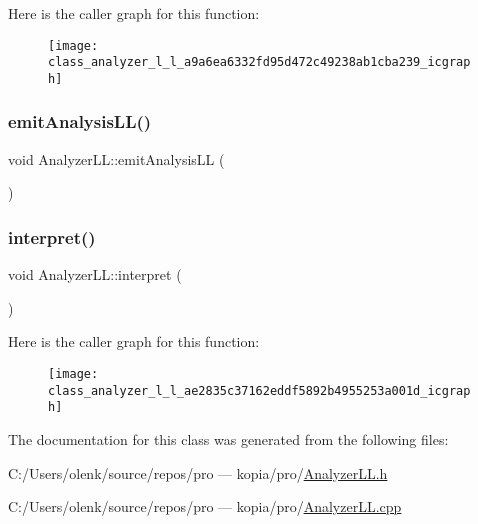 Here is the caller graph for this function\+:
\nopagebreak
\begin{figure}[H]
\begin{center}
\leavevmode
\texttt{[image: class\_analyzer\_l\_l\_a9a6ea6332fd95d472c49238ab1cba239\_icgraph]}
\end{center}
\end{figure}
\mbox{\label{class_analyzer_l_l_ae5196d3b6fa7c77e476757e0bc933472}} 
\subsubsection{\texorpdfstring{emitAnalysisLL()}{emitAnalysisLL()}}
{\footnotesize\ttfamily void Analyzer\+L\+L\+::emit\+Analysis\+LL (\begin{DoxyParamCaption}{ }\end{DoxyParamCaption})}

\mbox{\label{class_analyzer_l_l_ae2835c37162eddf5892b4955253a001d}} 
\subsubsection{\texorpdfstring{interpret()}{interpret()}}
{\footnotesize\ttfamily void Analyzer\+L\+L\+::interpret (\begin{DoxyParamCaption}{ }\end{DoxyParamCaption})}

Here is the caller graph for this function\+:
\nopagebreak
\begin{figure}[H]
\begin{center}
\leavevmode
\texttt{[image: class\_analyzer\_l\_l\_ae2835c37162eddf5892b4955253a001d\_icgraph]}
\end{center}
\end{figure}


The documentation for this class was generated from the following files\+:\begin{DoxyCompactItemize}
\item 
C\+:/\+Users/olenk/source/repos/pro — kopia/pro/\mbox{\hyperlink{_analyzer_l_l_8h}{Analyzer\+L\+L.\+h}}\item 
C\+:/\+Users/olenk/source/repos/pro — kopia/pro/\mbox{\hyperlink{_analyzer_l_l_8cpp}{Analyzer\+L\+L.\+cpp}}\end{DoxyCompactItemize}
